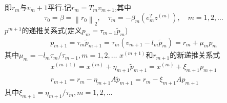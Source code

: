 \documentclass[12pt,a4paper]{article}
\begin{document}
即$r_m$与$v_m+1$平行.记{\color{blue}$r_{m}=T_{m} v_{m+1}$},其中
$$
\tau_{0}=\beta=\left\|r_{0}\right\|_{2}, \quad \tau_{m}=-\beta_{m}\left(e_{m}^{T} z^{(m)}\right), \quad m=1,2, \ldots
$$
{\color{blue}$p^{m+1}$的递推关系式}(定义$p_{m}=\tau_{m-1} \tilde{p}_{m}$)
\begin{align*}
p_{m+1}=\tau_{m} \tilde{p}_{m+1}=\tau_{m}\left(v_{m+1}-l_{m} \tilde{p}_{m}\right)=r_{m}+\mu_{m} p_{m}
\tag{7.10}
\end{align*}
其中$\mu_{m}=-l_{m} \tau_{m} / \tau_{m-1}, m=1,2, \ldots$
{\color{blue}$x^{(m+1)}$和$r_{m+1}$的新递推关系式}
\begin{align*}
x^{(m+1)}=x^{(m)}+\eta_{m+1} \tilde{p}_{m+1}=x^{(m)}+\xi_{m+1} p_{m+1}\tag{7.11}\\
r_{m+1}=r_{m}-\eta_{m+1} A \tilde{p}_{m+1}=r_{m}-\xi_{m+1} A p_{m+1}
\tag{7.12}
\end{align*}
其中$\xi_{m+1}=\eta_{m+1} / \tau_{m}, m=1,2, \ldots$
\end{document}
